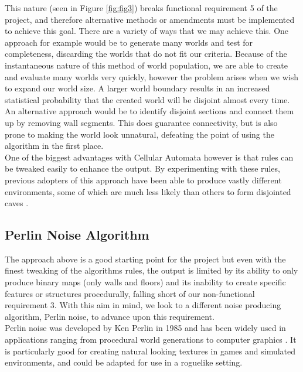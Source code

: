 \documentclass[12pt,a4paper]{article}
\begin{document}
This nature (seen in Figure \ref{fig:fig3}) breaks functional requirement 5 of the project, and therefore alternative methods or amendments must be implemented to achieve this goal. There are a variety of ways that we may achieve this. One approach for example would be to generate many worlds and test for completeness, discarding the worlds that do not fit our criteria. Because of the instantaneous nature of this method of world population, we are able to create and evaluate many worlds very quickly, however the problem arises when we wish to expand our world size. A larger world boundary results in an increased statistical probability that the created world will be disjoint almost every time. An alternative approach would be to identify disjoint sections and connect them up by removing wall segments. This does guarantee connectivity, but is also prone to making the world look unnatural, defeating the point of using the algorithm in the first place. \\

One of the biggest advantages with Cellular Automata however is that rules can be tweaked easily to enhance the output. By experimenting with these rules, previous adopters of this approach have been able to produce vastly different environments, some of which are much less likely than others to form disjointed caves \cite{roguebasin}. \\


\subsection{Perlin Noise Algorithm}

The approach above is a good starting point for the project but even with the finest tweaking of the algorithms rules, the output is limited by its ability to only produce binary maps (only walls and floors) and its inability to create specific features or structures procedurally, falling short of our non-functional requirement 3. With this aim in mind, we look to a different noise producing algorithm, Perlin noise, to advance upon this requirement. \\


Perlin noise was developed by Ken Perlin in 1985 and has been widely used in applications ranging from procedural world generations to computer graphics \cite{imagesynth} \cite{surveyPNF}. It is particularly good for creating natural looking textures in games and simulated environments, and could be adapted for use in a roguelike setting.\\
\end{document}
